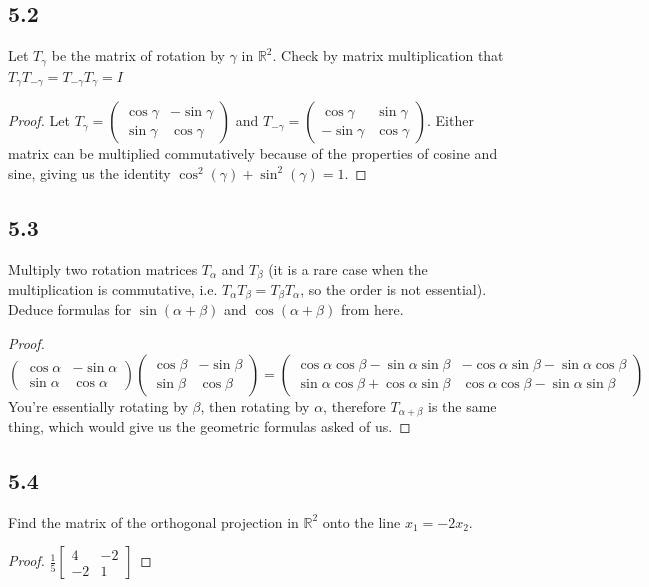\documentclass{amsart}
\begin{document}
\subsection*{5.2} Let $T_\gamma$ be the matrix of rotation by $\gamma$ in $\mathbb{R}^2$. Check by matrix multiplication that $T_\gamma T_{-\gamma} = T_{-\gamma} T_\gamma = I$
\begin{proof}
    Let $T_\gamma = \begin{pmatrix} \cos \gamma & -\sin \gamma \\ \sin \gamma & \cos \gamma \end{pmatrix}$ and $T_{-\gamma} = \begin{pmatrix} \cos \gamma & \sin \gamma \\ -\sin \gamma & \cos \gamma \end{pmatrix}$. Either matrix can be multiplied commutatively because of the properties of cosine and sine, giving us the identity $\cos^2(\gamma) + \sin^2(\gamma)=1$. 
\end{proof}
\subsection*{5.3} Multiply two rotation matrices $T_\alpha$ and $T_\beta$ (it is a rare case when the multiplication is commutative, i.e. $T_\alpha T_\beta = T_\beta T_\alpha$, so the order is not essential). Deduce formulas for $\sin(\alpha + \beta)$ and $\cos(\alpha + \beta)$ from here.
\begin{proof}
   $ \begin{pmatrix}
\cos\alpha & -\sin\alpha\\
\sin\alpha & \cos\alpha
\end{pmatrix}
\begin{pmatrix}
\cos\beta & -\sin\beta\\
\sin\beta & \cos\beta
\end{pmatrix} = \begin{pmatrix}
\cos\alpha\cos\beta-\sin\alpha\sin\beta
&
-\cos\alpha\sin\beta-\sin\alpha\cos\beta
\\
\sin\alpha\cos\beta+\cos\alpha\sin\beta
&
\cos\alpha\cos\beta-\sin\alpha\sin\beta
\end{pmatrix}$
You're essentially rotating by $\beta$, then rotating by $\alpha$, therefore $T_{\alpha + \beta}$ is the same thing, which would give us the geometric formulas asked of us. 
\end{proof}

\subsection*{5.4}Find the matrix of the orthogonal projection in $\mathbb{R}^2$ onto the line $x_1 = -2x_2$.
\begin{proof}
    $ \frac{1}{5} \begin{bmatrix} 4 & -2 \\ -2 & 1 \end{bmatrix}$
\end{proof}
\end{document}
